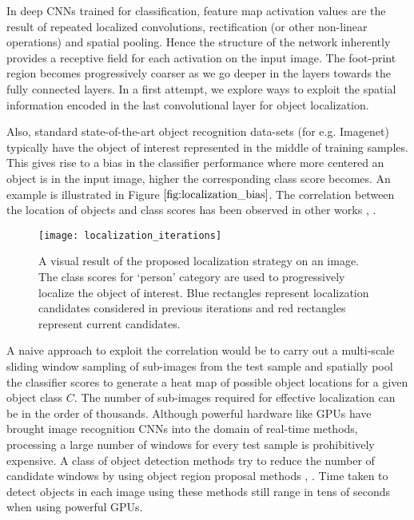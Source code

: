 \documentclass[runningheads]{llncs}
\begin{document}
In deep CNNs trained for classification, feature map activation values are the result of repeated localized convolutions, rectification (or other non-linear operations) and spatial pooling. Hence the structure of the network inherently provides a receptive field for each activation on the input image. The foot-print region becomes progressively coarser as we go deeper in the layers towards the fully connected layers. In a first attempt, we explore ways to exploit the spatial information encoded in the last convolutional layer for object localization.

Also, standard state-of-the-art object recognition data-sets (for e.g. Imagenet) typically have the object of interest represented in the middle of training samples. This gives rise to a bias in the classifier performance where more centered an object is in the input image, higher the corresponding class score becomes. An example is illustrated in Figure $\ref{fig:localization_bias}$.  The correlation between the location of objects and class scores has been observed in other works \cite{Oquab14}, \cite{girshick2014rich}.

\begin{figure*}
\begin{center}
\texttt{[image: localization\_iterations]}
\end{center}
   \caption{A visual result of the proposed localization strategy on an image. The class scores for `person' category are used to progressively localize the object of interest. Blue rectangles represent localization candidates considered in previous iterations and red rectangles represent current candidates.}
\label{fig:localization_iterations}
\end{figure*}

A naive approach to exploit the correlation would be to carry out a multi-scale sliding window sampling of sub-images from the test sample and spatially pool the classifier scores to generate a heat map of possible object locations for a given object class $C$. The number of sub-images required for effective localization can be in the order of thousands. Although powerful hardware like GPUs have brought image recognition CNNs  into the domain of real-time methods, processing a large number of windows for every test sample is prohibitively expensive. A class of object detection methods \cite{girshick2014rich} try to reduce the number of candidate windows by using object region proposal methods \cite{uijlings2013selective}, \cite{alexe2012measuring}. Time taken to detect objects in each image using these methods still range in tens of seconds when using powerful GPUs.
\end{document}
